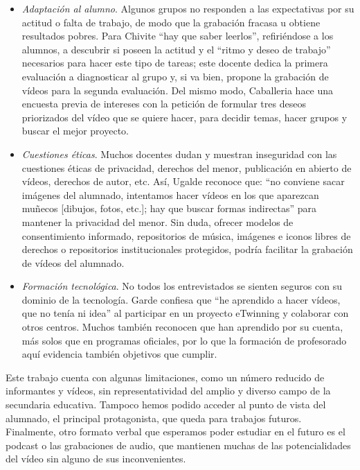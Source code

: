 \documentclass[spanish]{textolivre}
\begin{document}
\begin{itemize}
    \item \textit{Adaptación al alumno}. Algunos grupos no responden a las expectativas por su actitud o falta de trabajo, de modo que la grabación fracasa u obtiene resultados pobres. Para Chivite “hay que saber leerlos”, refiriéndose a los alumnos, a descubrir si poseen la actitud y el “ritmo y deseo de trabajo” necesarios para hacer este tipo de tareas; este docente dedica la primera evaluación a diagnosticar al grupo y, si va bien, propone la grabación de vídeos para la segunda evaluación. Del mismo modo, Caballeria hace una encuesta previa de intereses con la petición de formular tres deseos priorizados del vídeo que se quiere hacer, para decidir temas, hacer grupos y buscar el mejor proyecto.
    \item \textit{Cuestiones éticas}. Muchos docentes dudan y muestran inseguridad con las cuestiones éticas de privacidad, derechos del menor, publicación en abierto de vídeos, derechos de autor, etc. Así, Ugalde reconoce que: “no conviene sacar imágenes del alumnado, intentamos hacer vídeos en los que aparezcan muñecos [dibujos, fotos, etc.]; hay que buscar formas indirectas” para mantener la privacidad del menor. Sin duda, ofrecer modelos de consentimiento informado, repositorios de música, imágenes e iconos libres de derechos o repositorios institucionales protegidos, podría facilitar la grabación de vídeos del alumnado.
    \item \textit{Formación tecnológica}. No todos los entrevistados se sienten seguros con su dominio de la tecnología. Garde confiesa que “he aprendido a hacer vídeos, que no tenía ni idea” al participar en un proyecto eTwinning y colaborar con otros centros. Muchos también reconocen que han aprendido por su cuenta, más solos que en programas oficiales, por lo que la formación de profesorado aquí evidencia también objetivos que cumplir.
\end{itemize}

Este trabajo cuenta con algunas limitaciones, como un número reducido de informantes y vídeos, sin representatividad del amplio y diverso campo de la secundaria educativa. Tampoco hemos podido acceder al punto de vista del alumnado, el principal protagonista, que queda para trabajos futuros. Finalmente, otro formato verbal que esperamos poder estudiar en el futuro es el podcast o las grabaciones de audio, que mantienen muchas de las potencialidades del vídeo sin alguno de sus inconvenientes.
\end{document}

